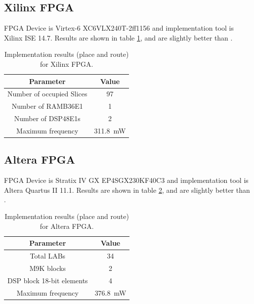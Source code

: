 \documentclass[a4paper, titlepage]{article}
\begin{document}
\subsection{Xilinx FPGA}
FPGA Device is Virtex-6 XC6VLX240T-2ff1156 and
implementation tool is Xilinx ISE 14.7.
Results are shown in table \ref{tbl:impxil}, and are slightly better than \cite{dicomlab}.
\begin{table}[!htbp]
\centering
\caption{Implementation results (place and route) for Xilinx FPGA.}
\label{tbl:impxil}
\begin{tabular}{cc}
    \addlinespace
    \toprule

    \textbf{Parameter} & \textbf{Value} \\

    \midrule

    Number of occupied Slices & 97 \\
    Number of RAMB36E1 & 1 \\
    Number of DSP48E1s & 2 \\
    Maximum frequency & \SI{311.8}{\milli\watt} \\

    \bottomrule
\end{tabular}
\end{table}

\subsection{Altera FPGA}
FPGA Device is Stratix IV GX EP4SGX230KF40C3 and
implementation tool is Altera Quartus II 11.1.
Results are shown in table \ref{tbl:impalt}, and are slightly better than \cite{dicomlab}.
\begin{table}[!htbp]
\centering
\caption{Implementation results (place and route) for Altera FPGA.}
\label{tbl:impalt}
\begin{tabular}{cc}
    \addlinespace
    \toprule

    \textbf{Parameter} & \textbf{Value} \\

    \midrule

    Total LABs & 34 \\
    M9K blocks & 2 \\
    DSP block 18-bit elements & 4 \\
    Maximum frequency & \SI{376.8}{\milli\watt} \\

    \bottomrule
\end{tabular}
\end{table}
\end{document}
